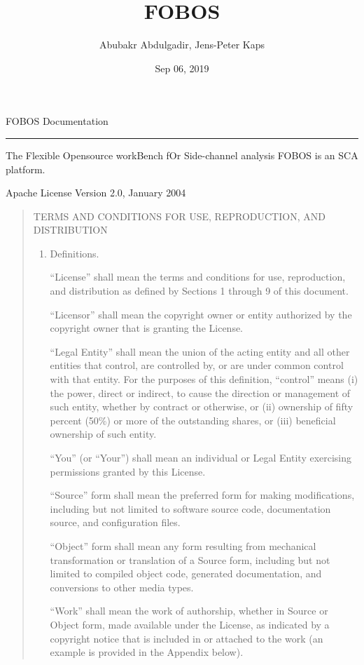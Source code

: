 \documentclass[letterpaper,10pt,english]{sphinxmanual}
\title{FOBOS}
\date{Sep 06, 2019}
\author{Abubakr Abdulgadir, Jens-Peter Kaps}
\begin{document}
\pagestyle{empty}
\sphinxmaketitle
\pagestyle{plain}
\sphinxtableofcontents
\pagestyle{normal}
\label{\detokenize{index::doc}}
FOBOS Documentation


\bigskip\hrule\bigskip


The Flexible Opensource workBench fOr Side-channel analysis FOBOS is an SCA platform.



Apache License
Version 2.0, January 2004
\begin{quote}

TERMS AND CONDITIONS FOR USE, REPRODUCTION, AND DISTRIBUTION
\begin{enumerate}
%
\item {} 
Definitions.

“License” shall mean the terms and conditions for use, reproduction,
and distribution as defined by Sections 1 through 9 of this document.

“Licensor” shall mean the copyright owner or entity authorized by
the copyright owner that is granting the License.

“Legal Entity” shall mean the union of the acting entity and all
other entities that control, are controlled by, or are under common
control with that entity. For the purposes of this definition,
“control” means (i) the power, direct or indirect, to cause the
direction or management of such entity, whether by contract or
otherwise, or (ii) ownership of fifty percent (50\%) or more of the
outstanding shares, or (iii) beneficial ownership of such entity.

“You” (or “Your”) shall mean an individual or Legal Entity
exercising permissions granted by this License.

“Source” form shall mean the preferred form for making modifications,
including but not limited to software source code, documentation
source, and configuration files.

“Object” form shall mean any form resulting from mechanical
transformation or translation of a Source form, including but
not limited to compiled object code, generated documentation,
and conversions to other media types.

“Work” shall mean the work of authorship, whether in Source or
Object form, made available under the License, as indicated by a
copyright notice that is included in or attached to the work
(an example is provided in the Appendix below).


\end{enumerate}
\end{quote}
\end{document}
